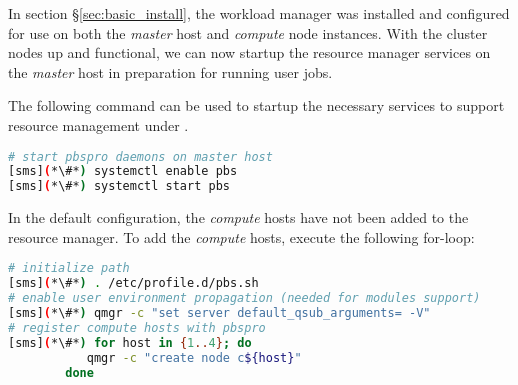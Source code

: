 
In section \S\ref{sec:basic_install}, the \rms{} workload manager was installed
and configured for use on both the {\em master} host and {\em compute} node
instances. With the cluster nodes up and functional, we can now startup the
resource manager services on the {\em master} host in preparation for running 
user jobs.

The following command can be used to startup the necessary services to support
resource management under \rms{}.

\begin{lstlisting}[language=bash,keywords={}]
# start pbspro daemons on master host
[sms](*\#*) systemctl enable pbs
[sms](*\#*) systemctl start pbs
\end{lstlisting}

In the default configuration, the {\em compute} hosts have not been added to 
the \rms{} resource manager. To add the {\em compute} hosts, execute 
the following for-loop:

\begin{lstlisting}[language=bash,keywords={}]
# initialize path
[sms](*\#*) . /etc/profile.d/pbs.sh
# enable user environment propagation (needed for modules support)
[sms](*\#*) qmgr -c "set server default_qsub_arguments= -V"
# register compute hosts with pbspro
[sms](*\#*) for host in {1..4}; do
           qmgr -c "create node c${host}"
        done
\end{lstlisting}

